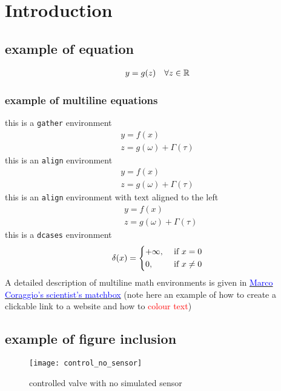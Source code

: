 \documentclass[../thesis.tex]{subfiles}
\begin{document}
\chapter{Introduction}\label{chap:intro}
\lipsum[1]

\section{example of equation}
\begin{gather}
    y = g(z) \quad \forall z \in \mathbb{R}
\end{gather}
\subsection{example of multiline equations}
this is a \verb|gather| environment
\begin{gather}
    y = f(x)\\
    z = g(\omega) + \Gamma(\tau)
\end{gather}
this is an \verb|align| environment
\begin{align}
    y = f(x) \\
    z = g(\omega) + \Gamma(\tau)
\end{align}
this is an \verb|align| environment with text aligned to the left
\begin{align}
    & y = f(x) \\
    & z = g(\omega) + \Gamma(\tau)
\end{align}
this is a \verb|dcases| environment
\begin{gather}
    \delta(x) = 
    \begin{dcases}
        +\infty, &\text{ if } x = 0\\
        0, &\text{ if } x \neq 0
    \end{dcases}
\end{gather}
A detailed description of multiline math environments is given in \href{https://github.com/marco-coraggio/scientist-s-matchbox}{\textcolor{blue}{Marco Coraggio's scientist's matchbox}} (note here an example of how to create a clickable link to a website and how to \textcolor{red}{colour text})


\section{example of figure inclusion}
\begin{figure}
    \centering
    \texttt{[image: control\_no\_sensor]}
    \caption{controlled valve with no simulated sensor}
    \label{fig:cns}
\end{figure}
\end{document}
